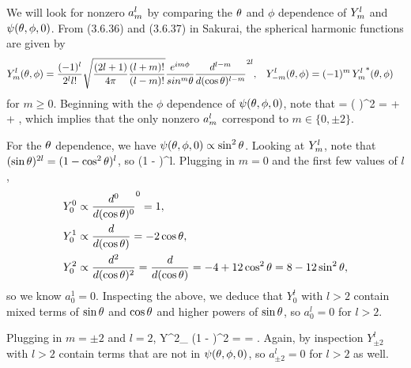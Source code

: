 \begin{solution}
	We will look for nonzero $a^l_m$ by comparing the $\theta$ and $\phi$ dependence of $Y^l_m$ and $\psi(\theta, \phi, 0)$.  From (3.6.36) and (3.6.37) in Sakurai, the spherical harmonic functions are given by
	\begin{align*}
		Y^l_m(\theta, \phi) &= \frac{(-1)^l}{2^l l!} \sqrt{\frac{(2l + 1)}{4\pi} \frac{(l + m)!}{(l - m)!}} \frac{e^{i m \phi}}{sin^m{\theta}} \dv[l - m]{}{(\cos{\theta})} (\sin{\theta})^{2l}, &
		Y^l_{-m}(\theta, \phi) &= (-1)^m \, {Y^l_m}^*(\theta, \phi)
	\end{align*}
	for $m \geq 0$.  Beginning with the $\phi$ dependence of $\psi(\theta, \phi, 0)$, note that
	\beqn \label{cos}
		\psitpo \propto \coswp = \left(  \right)^2 =  +  + ,
	\eeqn
	which implies that the only nonzero $a^l_m$ correspond to $m \in \{ 0, \pm 2 \}$.
	
	For the $\theta$ dependence, we have $\psi(\theta, \phi, 0) \propto \sin^2{\theta}$.  Looking at $Y^l_m$, note that $(\sin{\theta})^{2l} = (1 - \cos^2{\theta})^l$, so
	\beq
		\Ylm \propto {} \dv[l - m]{}{(\cost)} (1 - \coswt)^l.
	\eeq
	Plugging in $m = 0$ and the first few values of $l$,
	\begin{align*}
		Y^0_0 &\propto \dv[0]{}{(\cos{\theta})} (1 - \cos^2{\theta})^0 = 1, \\
		Y^1_0 &\propto \dv{}{(\cos{\theta})} (1 - \cos^2{\theta}) = -2\cos{\theta}, \\
		Y^2_0 &\propto \dv[2]{}{(\cos{\theta})} (1 - 2\cos^2{\theta} + \cos^4{\theta}) = \dv{}{(\cos{\theta})} (-4 \cos{\theta} + 4 \cos^3{\theta}) = -4 + 12 \cos^2{\theta} = 8 - 12 \sin^2{\theta},
	\end{align*}
	so we know $a^1_0 = 0$.  Inspecting the above, we deduce that $Y^l_0$ with $l > 2$ contain mixed terms of $\sin{\theta}$ and $\cos{\theta}$ and higher powers of $\sin{\theta}$, so $a^l_0 = 0$ for $l > 2$.
	
	Plugging in $m = \pm 2$ and $l = 2$,
	\beq
		Y^2_{} \propto {} \dv[0]{}{(\cost)} (1 - \coswt)^2 =  = \sinwt.
	\eeq
	Again, by inspection $Y^l_{\pm2}$ with $l > 2$ contain terms that are not in $\psi(\theta, \phi, 0)$, so $a^l_{\pm2} = 0$ for $l > 2$ as well.
	

\end{solution}
